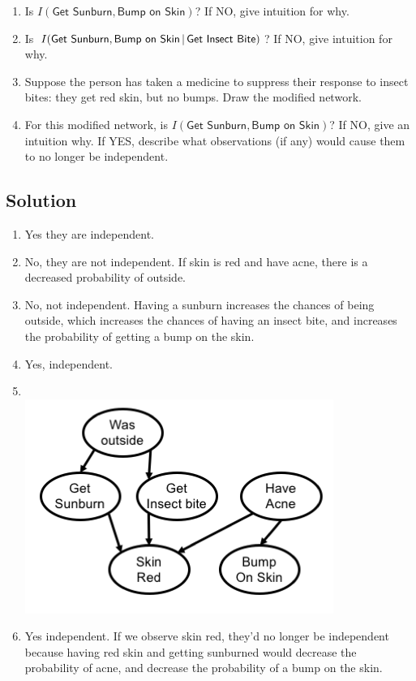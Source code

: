 \documentclass[submit]{harvardml}
\newcommand{\attr}[1]{\textsf{#1}}
\begin{document}
\begin{problem}
\begin{enumerate}
\item Is $I(\attr{Get Sunburn},\attr{Bump on Skin})$? If NO, give intuition for
    why.

\item Is $I(\attr{Get Sunburn},\attr{Bump on Skin}\given \attr{Get Insect
    Bite})$? If NO, give intuition for why.

\item Suppose the person has taken a medicine to suppress their response to
    insect bites: they get red skin, but no bumps.  Draw the modified network.


\item For this modified network, is $I(\attr{Get Sunburn},\attr{Bump on
    Skin})$? If NO, give an intuition why.  If YES, describe what observations
    (if any) would cause them to no longer be independent.

\end{enumerate}
\end{problem}

\subsection*{Solution}
\begin{enumerate}
    \item
        Yes they are independent.
    \item
        No, they are not independent. If skin is red and have acne, there is a
        decreased probability of outside.
    \item
        No, not independent. Having a sunburn increases the chances of being
        outside, which increases the chances of having an insect bite, and
        increases the probability of getting a bump on the skin.
    \item
        Yes, independent.
    \item \text{} \\
        \includegraphics[scale=.5]{bn2.png}
    \item
        Yes independent. If we observe skin red, they'd no longer be
        independent because having red skin and getting sunburned would
        decrease the probability of acne, and decrease the probability of a
        bump on the skin.
\end{enumerate}
\end{document}
